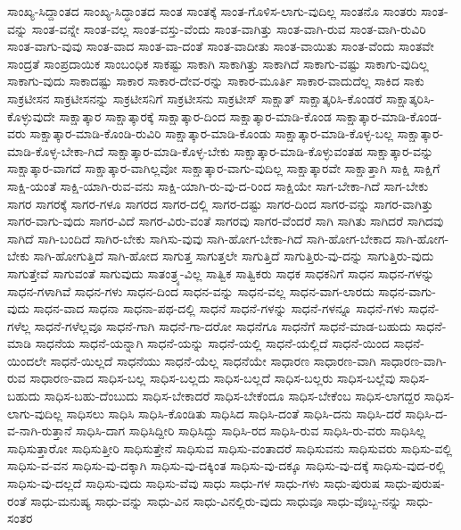 {ಸಾಂಖ್ಯ-ಸಿದ್ದಾಂತದ
ಸಾಂಖ್ಯ-ಸಿದ್ಧಾಂತದ
ಸಾಂತ
ಸಾಂತಕ್ಕೆ
ಸಾಂತ-ಗೊಳಿಸ-ಲಾಗು-ವುದಿಲ್ಲ
ಸಾಂತನೊ
ಸಾಂತರು
ಸಾಂತ-ವನ್ನು
ಸಾಂತ-ವನ್ನೇ
ಸಾಂತ-ವಲ್ಲ
ಸಾಂತ-ವಸ್ತು-ವೆಂದು
ಸಾಂತ-ವಾಗಿತ್ತು
ಸಾಂತ-ವಾಗಿ-ರುವ
ಸಾಂತ-ವಾಗಿ-ರುವಿರಿ
ಸಾಂತ-ವಾಗು-ವುವು
ಸಾಂತ-ವಾದ
ಸಾಂತ-ವಾ-ದಂತೆ
ಸಾಂತ-ವಾದೀತು
ಸಾಂತ-ವಾಯಿತು
ಸಾಂತ-ವೆಂದು
ಸಾಂತವೇ
ಸಾಂದ್ರತೆ
ಸಾಂಪ್ರದಾಯಿಕ
ಸಾಂಬಂಧಿಕ
ಸಾಕಷ್ಟು
ಸಾಕಾಗಿ
ಸಾಕಾಗಿತ್ತು
ಸಾಕಾಗಿದೆ
ಸಾಕಾಗು-ವಷ್ಟು
ಸಾಕಾಗು-ವುದಿಲ್ಲ
ಸಾಕಾಗು-ವುದು
ಸಾಕಾದಷ್ಟು
ಸಾಕಾರ
ಸಾಕಾರ-ದೇವ-ರನ್ನು
ಸಾಕಾರ-ಮೂರ್ತಿ
ಸಾಕಾರ-ವಾದುದೆಲ್ಲ
ಸಾಕಿದ
ಸಾಕು
ಸಾಕ್ರಟೀಸನ
ಸಾಕ್ರಟೀಸನನ್ನು
ಸಾಕ್ರಟೀಸನಿಗೆ
ಸಾಕ್ರಟೀಸನು
ಸಾಕ್ರಟೀಸ್
ಸಾಕ್ಷಾತ್
ಸಾಕ್ಷಾತ್ಕರಿಸಿ-ಕೊಂಡರೆ
ಸಾಕ್ಷಾತ್ಕರಿಸಿ-ಕೊಳ್ಳುವುದೇ
ಸಾಕ್ಷಾತ್ಕಾರ
ಸಾಕ್ಷಾತ್ಕಾರಕ್ಕೆ
ಸಾಕ್ಷಾತ್ಕಾರ-ದಿಂದ
ಸಾಕ್ಷಾತ್ಕಾರ-ಮಾಡಿ-ಕೊಂಡ
ಸಾಕ್ಷಾತ್ಕಾರ-ಮಾಡಿ-ಕೊಂಡ-ವರು
ಸಾಕ್ಷಾತ್ಕಾರ-ಮಾಡಿ-ಕೊಂಡಿ-ರುವಿರಿ
ಸಾಕ್ಷಾತ್ಕಾರ-ಮಾಡಿ-ಕೊಂಡು
ಸಾಕ್ಷಾತ್ಕಾರ-ಮಾಡಿ-ಕೊಳ್ಳ-ಬಲ್ಲ
ಸಾಕ್ಷಾತ್ಕಾರ-ಮಾಡಿ-ಕೊಳ್ಳ-ಬೇಕಾ-ಗಿದೆ
ಸಾಕ್ಷಾತ್ಕಾರ-ಮಾಡಿ-ಕೊಳ್ಳ-ಬೇಕು
ಸಾಕ್ಷಾತ್ಕಾರ-ಮಾಡಿ-ಕೊಳ್ಳುವಂತಹ
ಸಾಕ್ಷಾತ್ಕಾರ-ವನ್ನು
ಸಾಕ್ಷಾತ್ಕಾರ-ವಾಗದೆ
ಸಾಕ್ಷಾತ್ಕಾರ-ವಾಗಿಲ್ಲವೋ
ಸಾಕ್ಷಾತ್ಕಾರ-ವಾಗು-ವುದಿಲ್ಲ
ಸಾಕ್ಷಾತ್ಕಾರವೇ
ಸಾಕ್ಷಾತ್ತಾಗಿ
ಸಾಕ್ಷಿ
ಸಾಕ್ಷಿಗೆ
ಸಾಕ್ಷಿ-ಯಂತೆ
ಸಾಕ್ಷಿ-ಯಾಗಿ-ರುವ-ವನು
ಸಾಕ್ಷಿ-ಯಾಗಿ-ರು-ವು-ದ-ರಿಂದ
ಸಾಕ್ಷಿಯೇ
ಸಾಗ-ಬೇಕಾ-ಗಿದೆ
ಸಾಗ-ಬೇಕು
ಸಾಗರ
ಸಾಗರಕ್ಕೆ
ಸಾಗರ-ಗಳೂ
ಸಾಗರದ
ಸಾಗರ-ದಲ್ಲಿ
ಸಾಗರ-ದಷ್ಟು
ಸಾಗರ-ದಿಂದ
ಸಾಗರ-ವನ್ನು
ಸಾಗರ-ವಾಗಿತ್ತು
ಸಾಗರ-ವಾಗು-ವುದು
ಸಾಗರ-ವಿದೆ
ಸಾಗರ-ವಿರು-ವಂತೆ
ಸಾಗರವು
ಸಾಗರ-ವೆಂದರೆ
ಸಾಗಿ
ಸಾಗಿತು
ಸಾಗಿದರೆ
ಸಾಗಿದವು
ಸಾಗಿದೆ
ಸಾಗಿ-ಬಂದಿದೆ
ಸಾಗಿರ-ಬೇಕು
ಸಾಗಿಸು-ವುವು
ಸಾಗಿ-ಹೋಗ-ಬೇಕಾ-ಗಿದೆ
ಸಾಗಿ-ಹೋಗ-ಬೇಕಾದ
ಸಾಗಿ-ಹೋಗ-ಬೇಕು
ಸಾಗಿ-ಹೋಗುತ್ತಿದೆ
ಸಾಗಿ-ಹೋದ
ಸಾಗುತ್ತ
ಸಾಗುತ್ತಲೇ
ಸಾಗುತ್ತಿದೆ
ಸಾಗುತ್ತಿರು-ವು-ದನ್ನು
ಸಾಗುತ್ತಿರು-ವುದು
ಸಾಗುತ್ತೇವೆ
ಸಾಗುವಂತೆ
ಸಾಗುವುದು
ಸಾತಂತ್ರ್ಯ-ವಿಲ್ಲ
ಸಾತ್ವಿಕ
ಸಾತ್ವಿಕರು
ಸಾಧಕ
ಸಾಧಕನಿಗೆ
ಸಾಧನ
ಸಾಧನ-ಗಳನ್ನು
ಸಾಧನ-ಗಳಾಗಿವೆ
ಸಾಧನ-ಗಳು
ಸಾಧನ-ದಿಂದ
ಸಾಧನ-ವನ್ನು
ಸಾಧನ-ವಲ್ಲ
ಸಾಧನ-ವಾಗ-ಲಾರದು
ಸಾಧನ-ವಾಗು-ವುದು
ಸಾಧನ-ವಾದ
ಸಾಧನಾ
ಸಾಧನಾ-ಪಥ-ದಲ್ಲಿ
ಸಾಧನೆ
ಸಾಧನೆ-ಗಳನ್ನು
ಸಾಧನೆ-ಗಳನ್ನೂ
ಸಾಧನೆ-ಗಳು
ಸಾಧನೆ-ಗಳೆಲ್ಲ
ಸಾಧನೆ-ಗಳೆಲ್ಲವೂ
ಸಾಧನೆ-ಗಾಗಿ
ಸಾಧನೆ-ಗಾ-ದರೋ
ಸಾಧನೆಗೂ
ಸಾಧನೆಗೆ
ಸಾಧನೆ-ಮಾಡ-ಬಹುದು
ಸಾಧನೆ-ಮಾಡಿ
ಸಾಧನೆಯ
ಸಾಧನೆ-ಯನ್ನಾಗಿ
ಸಾಧನೆ-ಯನ್ನು
ಸಾಧನೆ-ಯಲ್ಲಿ
ಸಾಧನೆ-ಯಲ್ಲಿದೆ
ಸಾಧನೆ-ಯಿಂದ
ಸಾಧನೆ-ಯಿಂದಲೇ
ಸಾಧನೆ-ಯಿಲ್ಲದೆ
ಸಾಧನೆಯು
ಸಾಧನೆ-ಯೆಲ್ಲ
ಸಾಧನೆಯೇ
ಸಾಧಾರಣ
ಸಾಧಾರಣ-ವಾಗಿ
ಸಾಧಾರಣ-ವಾಗಿ-ರುವ
ಸಾಧಾರಣ-ವಾದ
ಸಾಧಿಸ-ಬಲ್ಲ
ಸಾಧಿಸ-ಬಲ್ಲದು
ಸಾಧಿಸ-ಬಲ್ಲದೆ
ಸಾಧಿಸ-ಬಲ್ಲರು
ಸಾಧಿಸ-ಬಲ್ಲೆವು
ಸಾಧಿಸ-ಬಹುದು
ಸಾಧಿಸ-ಬಹು-ದೆಂಬುದು
ಸಾಧಿಸ-ಬೇಕಾದರೆ
ಸಾಧಿಸ-ಬೇಕೆಂದೂ
ಸಾಧಿಸ-ಬೇಕೆಂಬ
ಸಾಧಿಸ-ಲಾಗದ್ದರ
ಸಾಧಿಸ-ಲಾಗು-ವುದಿಲ್ಲ
ಸಾಧಿಸಲು
ಸಾಧಿಸಿ
ಸಾಧಿಸಿ-ಕೊಂಡಿತು
ಸಾಧಿಸಿದ
ಸಾಧಿಸಿ-ದಂತೆ
ಸಾಧಿಸಿ-ದನು
ಸಾಧಿಸಿ-ದರೆ
ಸಾಧಿಸಿ-ದ-ವ-ನಾಗಿ-ರುತ್ತಾನೆ
ಸಾಧಿಸಿ-ದಾಗ
ಸಾಧಿಸಿದ್ದೀರಿ
ಸಾಧಿಸಿದ್ದು
ಸಾಧಿಸಿ-ರದ
ಸಾಧಿಸಿ-ರುವ
ಸಾಧಿಸಿ-ರು-ವರು
ಸಾಧಿಸಿಲ್ಲ
ಸಾಧಿಸುತ್ತಾರೋ
ಸಾಧಿಸುತ್ತೀರಿ
ಸಾಧಿಸುತ್ತೇನೆ
ಸಾಧಿಸುವ
ಸಾಧಿಸು-ವಂತಾದರೆ
ಸಾಧಿಸುವನು
ಸಾಧಿಸುವರು
ಸಾಧಿಸು-ವಲ್ಲಿ
ಸಾಧಿಸು-ವ-ವನ
ಸಾಧಿಸು-ವು-ದಕ್ಕಾಗಿ
ಸಾಧಿಸು-ವು-ದಕ್ಕಿಂತ
ಸಾಧಿಸು-ವು-ದಕ್ಕೂ
ಸಾಧಿಸು-ವು-ದಕ್ಕೆ
ಸಾಧಿಸು-ವುದ-ರಲ್ಲಿ
ಸಾಧಿಸು-ವು-ದಲ್ಲದೆ
ಸಾಧಿಸು-ವುದು
ಸಾಧಿಸು-ವೆವು
ಸಾಧು
ಸಾಧು-ಗಳ
ಸಾಧು-ಗಳು
ಸಾಧು-ಪುರುಷ
ಸಾಧು-ಪುರುಷ-ರಂತೆ
ಸಾಧು-ಮನುಷ್ಯ
ಸಾಧು-ವನ್ನು
ಸಾಧು-ವಿನ
ಸಾಧು-ವಿನಲ್ಲಿರು-ವುದು
ಸಾಧುವೂ
ಸಾಧು-ವೊಬ್ಬ-ನನ್ನು
ಸಾಧು-ಸಂತರ
}
